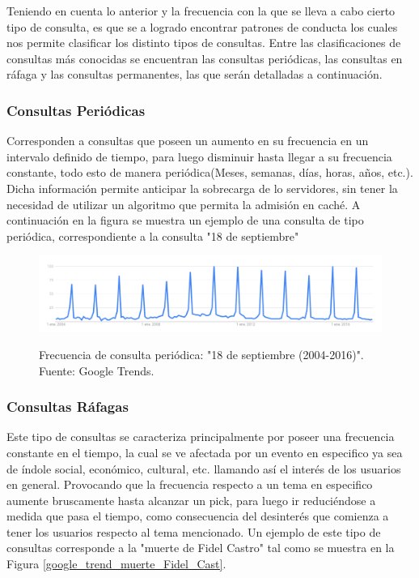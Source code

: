 \documentclass[12pt]{ociamthesis}  %
\begin{document}
Teniendo en cuenta lo anterior y la frecuencia con la que se lleva a cabo cierto tipo de consulta, es que se a logrado encontrar patrones de conducta los cuales nos permite clasificar los distinto tipos de consultas. Entre las clasificaciones de consultas más conocidas se encuentran las consultas periódicas, las consultas en ráfaga y las consultas permanentes, las que serán detalladas a continuación.\\

\subsubsection{Consultas Periódicas}
Corresponden a consultas que poseen un aumento en su frecuencia en un intervalo definido de tiempo, para luego disminuir hasta llegar a su frecuencia constante, todo esto de manera periódica(Meses, semanas, días, horas, años, etc.). Dicha información permite anticipar la sobrecarga de lo servidores, sin tener la necesidad de utilizar un algoritmo que permita la admisión en caché. A continuación en la figura se muestra un ejemplo de una consulta de tipo periódica, correspondiente a la consulta "18 de septiembre"\\

\begin{figure}[!htb]
	\centering
	\includegraphics[width=15cm]{18_sept_google_trend.png}\\
	\caption{Frecuencia de consulta periódica: "18 de septiembre (2004-2016)". Fuente: Google Trends.}
	\label{fig:mesh1}
\end{figure}

\subsubsection{Consultas Ráfagas}
Este tipo de consultas se caracteriza principalmente por poseer una frecuencia constante en el tiempo, la cual se ve afectada por un evento en especifico ya sea de índole social, económico, cultural, etc. llamando así el interés de los usuarios en general. Provocando que la frecuencia respecto a un tema en especifico aumente bruscamente hasta alcanzar un pick, para luego ir reduciéndose a medida que pasa el tiempo, como consecuencia del desinterés que comienza a tener los usuarios respecto al tema mencionado. Un ejemplo de este tipo de consultas corresponde a la "muerte de Fidel Castro" tal como se muestra en la Figura \ref{google_trend_muerte_Fidel_Cast}.\\
\end{document}
